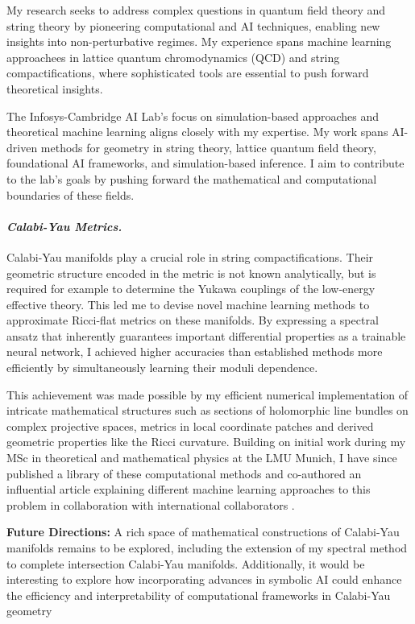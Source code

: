 \documentclass[11pt]{article}
\title{}
\author{}
\date{}
\begin{document}
\thispagestyle{firstpagestyle}


My research seeks to address complex questions in quantum field theory and string theory by pioneering computational and AI techniques, enabling new insights into non-perturbative regimes.
My experience spans machine learning approachees in lattice quantum chromodynamics (QCD) and string compactifications, where sophisticated tools are essential to push forward theoretical insights.

The Infosys-Cambridge AI Lab's focus on simulation-based approaches and theoretical machine learning aligns closely with my expertise.
My work spans AI-driven methods for geometry in string theory, lattice quantum field theory, foundational AI frameworks, and simulation-based inference.
I aim to contribute to the lab's goals by pushing forward the mathematical and computational boundaries of these fields.

\paragraph{\textit{{Calabi-Yau Metrics.}}}
Calabi-Yau manifolds play a crucial role in string compactifications.
Their geometric structure encoded in the metric is not known analytically, but is required for example to determine the Yukawa couplings of the low-energy effective theory.
This led me to devise novel machine learning methods to approximate Ricci-flat metrics on these manifolds.
By expressing a spectral ansatz that inherently guarantees important differential properties as a trainable neural network, I achieved higher accuracies than established methods more efficiently by simultaneously learning their moduli dependence.

This achievement was made possible by my efficient numerical implementation of intricate mathematical structures such as sections of holomorphic line bundles on complex projective spaces, metrics in local coordinate patches and derived geometric properties like the Ricci curvature.
Building on initial work during my MSc in theoretical and mathematical physics at the LMU Munich, I have since published a library of these computational methods \cite{gerdes2023CYJAXPackage} and co-authored an influential article explaining different machine learning approaches to this problem in collaboration with international collaborators \cite{anderson2021ModulidependentCalabiYau}.

\textbf{Future Directions:}
A rich space of mathematical constructions of Calabi-Yau manifolds remains to be explored, including the extension of my spectral method to complete intersection Calabi-Yau manifolds.
Additionally, it would be interesting to explore how incorporating advances in symbolic AI could enhance the efficiency and interpretability of computational frameworks in Calabi-Yau geometry
\end{document}
